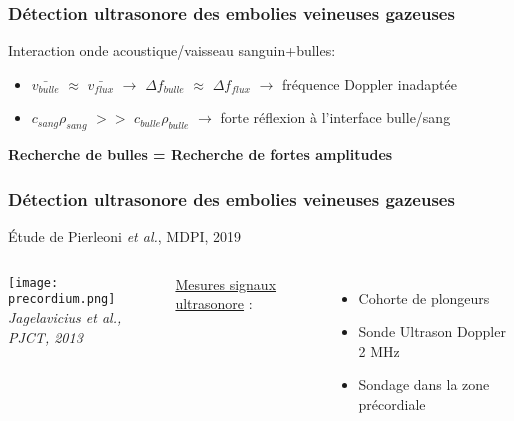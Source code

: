 \documentclass{beamer}
\begin{document}
\begin{frame}
\frametitle{Détection ultrasonore des embolies veineuses gazeuses}
Interaction onde acoustique/vaisseau sanguin+bulles:

\begin{center}
\end{center}
\vspace{0.1cm}
\begin{itemize}
\item $\bar{v_{bulle}}$ $\approx$ $\bar{v_{flux}}$ $\rightarrow$ $\Delta f_{bulle}$ $\approx$ $\Delta f_{flux}$ $\rightarrow$ fréquence Doppler inadaptée
\vspace{0.2cm}
\item $c_{sang} \rho_{sang}$ $>>$ $c_{bulle} \rho_{bulle}$ $\rightarrow$  forte réflexion à l'interface bulle/sang
\end{itemize}
\vspace{0.2cm}
\textbf{Recherche de bulles = Recherche de fortes amplitudes}


\end{frame}

\begin{frame}
\frametitle{Détection ultrasonore des embolies veineuses gazeuses}
\'Etude de Pierleoni \textit{et al.}, MDPI, 2019
\begin{columns}
\column{60mm}
\begin{center}
\texttt{[image: precordium.png]}\\
\textit{\footnotesize Jagelavicius et al., PJCT, 2013}
\end{center}
\column{60mm}
\underline{Mesures signaux ultrasonore} :
\vspace{0.2cm}
\begin{itemize}
\item Cohorte de plongeurs 
\vspace{0.2cm}
\item Sonde Ultrason Doppler 2 MHz
\vspace{0.2cm}
\item Sondage dans la zone précordiale 
\end{itemize}
\end{columns}

\end{frame}
\end{document}
